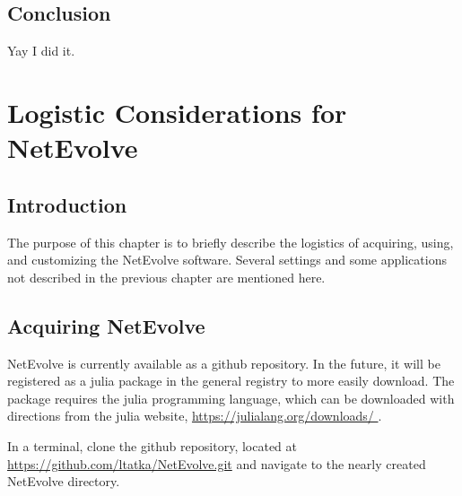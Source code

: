 \documentclass[12pt]{report}
\begin{document}
\section{Conclusion}
Yay I did it.
\\


	
\chapter{Logistic Considerations for NetEvolve}

\section{Introduction}
The purpose of this chapter is to briefly describe the logistics of acquiring, using, and customizing the NetEvolve software. Several settings and some applications not described in the previous chapter are mentioned here.

\section{Acquiring NetEvolve}
NetEvolve is currently available as a github repository. In the future, it will be registered as a julia package in the general registry to more easily download. The package requires the julia programming language, which can be downloaded with directions from the julia website, \url{https://julialang.org/downloads/ }.

In a terminal, clone the github repository, located at \url{https://github.com/ltatka/NetEvolve.git} and navigate to the nearly created NetEvolve directory.
\end{document}
